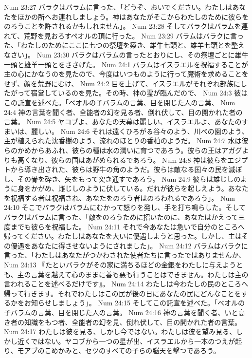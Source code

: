 Num 23:27  バラクはバラムに言った、「どうぞ、おいでください。わたしはあなたをほかの所へお連れしましょう。神はあなたがそこからわたしのために彼らをのろうことを許されるかもしれません」。
Num 23:28  そしてバラクはバラムを連れて、荒野を見おろすペオルの頂に行った。
Num 23:29  バラムはバラクに言った、「わたしのためにここに七つの祭壇を築き、雄牛七頭と、雄羊七頭とを整えなさい」。
Num 23:30  バラクはバラムの言ったとおりにし、その祭壇ごとに雄牛一頭と雄羊一頭とをささげた。
Num 24:1  バラムはイスラエルを祝福することが主の心にかなうのを見たので、今度はいつものように行って魔術を求めることをせず、顔を荒野にむけ、
Num 24:2  目を上げて、イスラエルがそれぞれ部族にしたがって宿営しているのを見た。その時、神の霊が臨んだので、
Num 24:3  彼はこの託宣を述べた。「ベオルの子バラムの言葉、目を閉じた人の言葉、
Num 24:4  神の言葉を聞く者、全能者の幻を見る者、倒れ伏して、目の開かれた者の言葉。
Num 24:5  ヤコブよ、あなたの天幕は麗しい、イスラエルよ、あなたのすまいは、麗しい。
Num 24:6  それは遠くひろがる谷々のよう、川べの園のよう、主が植えられた沈香樹のよう、流れのほとりの香柏のようだ。
Num 24:7  水は彼らのかめからあふれ、彼らの種は水の潤いに育つであろう。彼らの王はアガグよりも高くなり、彼らの国はあがめられるであろう。
Num 24:8  神は彼らをエジプトから導き出された、彼らは野牛の角のようだ。彼らは敵なる国々の民を滅ぼし、その骨を砕き、矢をもって突き通すであろう。
Num 24:9  彼らは雄じしのように身をかがめ、雌じしのように伏している。だれが彼らを起しえよう。あなたを祝福する者は祝福され、あなたをのろう者はのろわれるであろう」。
Num 24:10  そこでバラクはバラムにむかって怒りを発し、手を打ち鳴らした。そしてバラクはバラムに言った、「敵をのろうために招いたのに、あなたはかえって三度までも彼らを祝福した。
Num 24:11  それで今あなたは急いで自分のところへ帰ってください。わたしはあなたを大いに優遇しようと思った。しかし、主はその優遇をあなたに得させないようにされました」。
Num 24:12  バラムはバラクに言った、「わたしはあなたがつかわされた使者たちに言ったではありませんか、
Num 24:13  『たといバラクがその家に満ちるほどの金銀をわたしに与えようとも、主の言葉を越えて心のままに善も悪も行うことはできません。わたしは主の言われることを述べるだけです』。
Num 24:14  わたしは今わたしの民のところへ帰って行きます。それでわたしはこの民が後の日にあなたの民にどんなことをするかをお知らせしましょう」。
Num 24:15  そしてこの託宣を述べた。「ベオルの子バラムの言葉、目を閉じた人の言葉。
Num 24:16  神の言葉を聞く者、いと高き者の知識をもつ者、全能者の幻を見、倒れ伏して、目の開かれた者の言葉。
Num 24:17  わたしは彼を見る、しかし今ではない。わたしは彼を望み見る、しかし近くではない。ヤコブから一つの星が出、イスラエルから一本のつえが起り、モアブのこめかみと、セツのすべての子らの脳天を撃つであろう。
